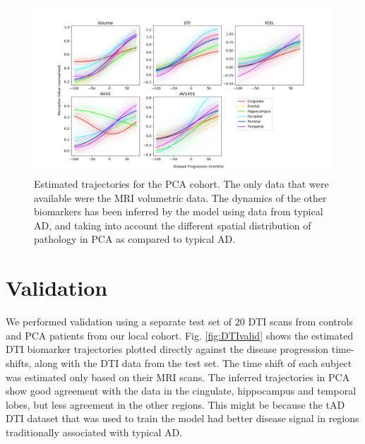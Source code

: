\documentclass{llncs}
\begin{document}
\begin{figure}
 \includegraphics[width=\textwidth, trim=0 20 0 0, clip]{figures/trajDisSpaceOverlap_PCA_tad-drcTinyPen1_JMD.png}
 \caption{Estimated trajectories for the PCA cohort. The only data that were available were the MRI volumetric data. The dynamics of the other biomarkers has been inferred by the model using data from typical AD, and taking into account the different spatial distribution of pathology in PCA as compared to typical AD.}
 \label{fig:PCAtrajByModality}
\end{figure}


\section{Validation}

We performed validation using a separate test set of 20 DTI scans from controls and PCA patients from our local cohort. Fig. \ref{fig:DTIvalid} shows the estimated DTI biomarker trajectories plotted directly against the disease progression time-shifts, along with the DTI data from the test set. The time shift of each subject was estimated only based on their MRI scans. The inferred trajectories in PCA show good agreement with the data in the cingulate, hippocampus and temporal lobes, but less agreement in the other regions. This might be because the tAD DTI dataset that was used to train the model had better disease signal in regions traditionally associated with typical AD.

\end{document}
